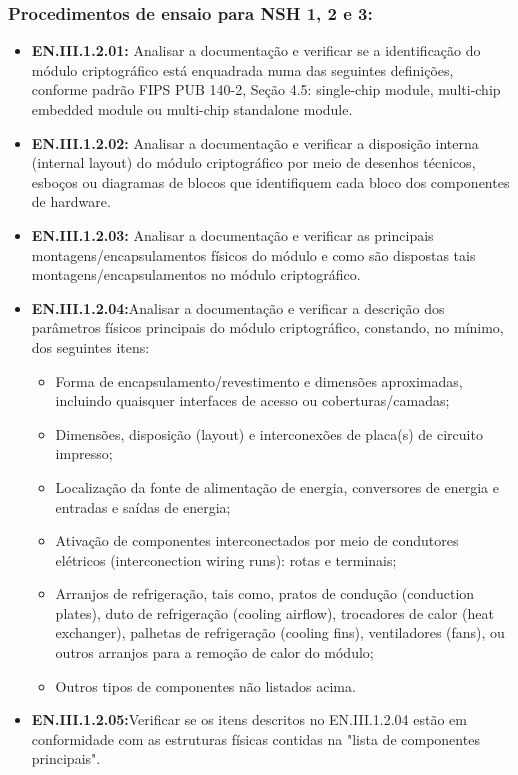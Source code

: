 \documentclass[12pt, a4paper]{article}
\begin{document}
    \subsubsection*{Procedimentos de ensaio para NSH 1, 2 e 3:}
    \begin{itemize}[leftmargin=*, nosep]
        \item \textbf{EN.III.1.2.01:} Analisar a documentação e verificar se a identificação do módulo criptográfico está enquadrada numa das seguintes definições, conforme padrão FIPS PUB 140-2, Seção 4.5: single-chip module, multi-chip embedded module ou multi-chip standalone module.
        \item \textbf{EN.III.1.2.02:} Analisar a documentação e verificar a disposição interna (internal layout) do módulo criptográfico por meio de desenhos técnicos, esboços ou diagramas de blocos que identifiquem cada bloco dos componentes de hardware.
        \item \textbf{EN.III.1.2.03:} Analisar a documentação e verificar as principais montagens/encapsulamentos físicos do
    módulo e como são dispostas tais montagens/encapsulamentos no módulo criptográfico.
        \item \textbf{EN.III.1.2.04:}Analisar a documentação e verificar a descrição dos parâmetros físicos principais do módulo
    criptográfico, constando, no mínimo, dos seguintes itens:
        \begin{itemize}
            \item Forma de encapsulamento/revestimento e dimensões aproximadas, incluindo quaisquer
    interfaces de acesso ou coberturas/camadas;
            \item Dimensões, disposição (layout) e interconexões de placa(s) de circuito impresso;
            \item Localização da fonte de alimentação de energia, conversores de energia e entradas e
    saídas de energia;
            \item Ativação de componentes interconectados por meio de condutores elétricos
    (interconection wiring runs): rotas e terminais;
            \item Arranjos de refrigeração, tais como, pratos de condução (conduction plates), duto de
    refrigeração (cooling airflow), trocadores de calor (heat exchanger), palhetas de
    refrigeração (cooling fins), ventiladores (fans), ou outros arranjos para a remoção de calor
    do módulo;
            \item Outros tipos de componentes não listados acima.
        \end{itemize}
        \item \textbf{EN.III.1.2.05:}Verificar se os itens descritos no EN.III.1.2.04 estão em conformidade com as estruturas físicas contidas na "lista de componentes principais".
    \end{itemize}  
    
\end{document}
